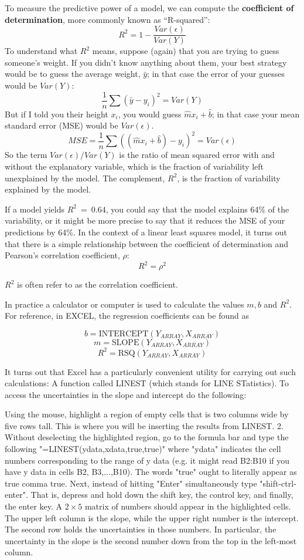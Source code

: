 To measure the predictive power of a model, we can compute the 
  \textbf{coefficient of determination}, more commonly known as ``R-squared'':
%
\[ R^2 = 1 - \frac{Var(\epsilon)}{Var(Y)}\]
%
To understand what $R^2$ means, suppose (again) that you are trying
to guess someone's weight.  If you didn't know anything about them,
your best strategy would be to guess the average weight, $\bar{y}$; in
that case the error of your guesses would be $Var(Y)$:
%
\[\frac{1}{n} \sum (\bar{y} - y_i)^2 = Var(Y) \]
%
But if I told you their height $x_i$, you would guess $\hat{m} x_i + \hat{b} $; in that case your mean standard error (MSE) would be $Var(\epsilon)$.
%
\[ MSE = 
\frac{1}{n} \sum ((\hat{m} x_i + \hat{b}) - y_i)^2 =
Var(\epsilon) \]
%
So the term $Var(\epsilon)/Var(Y)$ is the ratio of mean squared error with
and without the explanatory variable, which is the fraction of
variability left unexplained by the model.  The complement, $R^2$,
is the fraction of variability explained by the model.

If a model yields $R^2~=~0.64$, you could say that the model explains
64\% of the variability, or it might be more precise to say that it
reduces the MSE of your predictions by 64\%. In the context of a linear least squares model, it turns out that
there is a simple relationship between the coefficient of
determination and Pearson's correlation coefficient, $\rho$:
\[ R^2 = \rho^2  \]

$R^2$ is often refer to as the correlation coefficient.

In practice a calculator or computer is used to calculate the values $m, b$ and $R^2$.  For reference, in EXCEL, the regression coefficients can be found as

\[b= \textrm{INTERCEPT}\left(Y_{ARRAY},X_{ARRAY}\right)\] 
\[m= \textrm{SLOPE}(Y_{ARRAY},X_{ARRAY})\] 
\[R^2=\textrm{RSQ}(Y_{ARRAY},X_{ARRAY})\]
 
It turns out that Excel has a particularly convenient utility for carrying out such calculations: A function called LINEST (which stands for LINE STatistics). To access the uncertainties in the slope and intercept do the following:

Using the mouse, highlight a region of empty cells that is two columns wide by five rows tall. This is where you will be inserting the results from LINEST.
2. Without deselecting the highlighted region, go to the formula bar and type the following "=LINEST(ydata,xdata,true,true)" where "ydata" indicates the cell numbers corresponding to the range of y data (e.g. it might read B2:B10 if you have y data in cells B2, B3,...,B10). The words "true" ought to literally appear as true comma true. Next, instead of hitting "Enter" simultaneously type 
"shift-ctrl-enter". That is, depress and hold down the shift key, the
control key, and finally, the enter key. A $2\times 5$ matrix of numbers should appear in the highlighted cells. The upper left column is the
slope, while the upper right number is the intercept.
The second row holds the uncertainties in those numbers. In particular,
the uncertainty in the slope is the second number down from the top in the left-most column.



